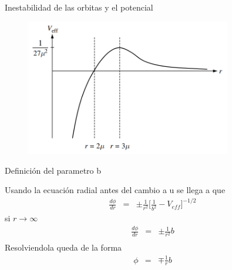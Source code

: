 \documentclass[xcolor=dvipsnames]{beamer}
\begin{document}
\begin{frame}{Inestabilidad de las orbitas y el potencial}
    \begin{figure}
        \centering
        \includegraphics[width=0.8\textwidth]{Presentations/Images/3_poten.png}
    \end{figure}
\end{frame}


\begin{frame}{Definición del parametro b}
    \begin{block}{}
    Usando la ecuación radial antes del cambio a u se llega a que
    \begin{eqnarray*}
    \frac{d\phi}{dr}&=&\pm \frac{1}{r^{2}}\Big[ \frac{1}{b^{2}} -V_{eff} \Big]^{-1/2}
    \end{eqnarray*}
    si $r \rightarrow \infty$
    \begin{eqnarray*}
    \frac{d\phi}{dr}&=&\pm \frac{1}{r^{2}}b\\
    \end{eqnarray*}
    Resolviendola queda de la forma
    \begin{eqnarray*}
    \phi&=&\mp \frac{1}{r}b\\
    \end{eqnarray*}
    \end{block}
\end{frame}
\end{document}
